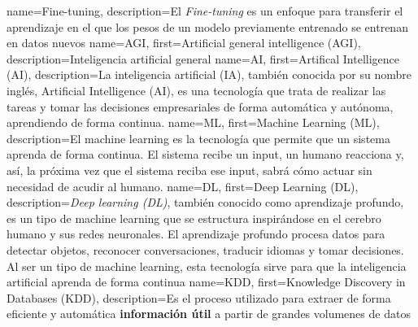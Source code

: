       {name={Fine-tuning},    description={El \textit{Fine-tuning} es un enfoque para transferir el aprendizaje en el que los pesos de un modelo previamente entrenado se entrenan en datos nuevos}}
      {name={AGI},        first={Artificial general intelligence (AGI)},          description={Inteligencia artificial general}}
       {name={AI},         first={Artifical Intelligence (AI)},                    description={La inteligencia artificial (IA), también conocida por su nombre inglés, Artificial Intelligence (AI), es una tecnología que trata de realizar las tareas y tomar las decisiones empresariales de forma automática y autónoma, aprendiendo de forma continua. \cite{glosario-tic-artificial-intelligence}}}
       {name={ML},         first={Machine Learning (ML)},                          description={El machine learning es la tecnología que permite que un sistema aprenda de forma continua. El sistema recibe un input, un humano reacciona y, así, la próxima vez que el sistema reciba ese input, sabrá cómo actuar sin necesidad de acudir al humano. \cite{glosario-tic-machine-learning}}}
       {name={DL},         first={Deep Learning (DL)},                             description={\textit{Deep learning (DL)}, también conocido como aprendizaje profundo, es un tipo de machine learning que se estructura inspirándose en el cerebro humano y sus redes neuronales. El aprendizaje profundo procesa datos para detectar objetos, reconocer conversaciones, traducir idiomas y tomar decisiones. Al ser un tipo de machine learning, esta tecnología sirve para que la inteligencia artificial aprenda de forma continua \cite{glosario-tic-deep-learning}}}
      {name={KDD},        first={Knowledge Discovery in Databases (KDD)},         description={Es el proceso utilizado para extraer de forma eficiente y automática \textbf{información útil} a partir de grandes volumenes de datos}}

